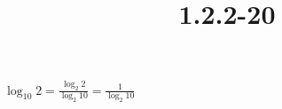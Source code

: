 \documentclass{article}
\title{1.2.2-20}
\begin{document}
\maketitle

\( \log_{10}{2} = \frac{\log_{2}{2}}{\log_{2}{10}} = \frac{1}{\log_{2}{10}} \)
\end{document}

